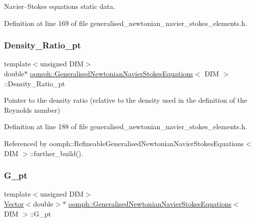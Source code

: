 Navier--Stokes equations static data. 

Definition at line 169 of file generalised\+\_\+newtonian\+\_\+navier\+\_\+stokes\+\_\+elements.\+h.

\mbox{\label{classoomph_1_1GeneralisedNewtonianNavierStokesEquations_a360d614813fbf4b87ad035226072b297}} 
\subsubsection{\texorpdfstring{Density\+\_\+\+Ratio\+\_\+pt}{Density\_Ratio\_pt}}
{\footnotesize\ttfamily template$<$unsigned D\+IM$>$ \\
double$\ast$ \hyperlink{classoomph_1_1GeneralisedNewtonianNavierStokesEquations}{oomph\+::\+Generalised\+Newtonian\+Navier\+Stokes\+Equations}$<$ D\+IM $>$\+::Density\+\_\+\+Ratio\+\_\+pt\hspace{0.3cm}{\ttfamily [protected]}}



Pointer to the density ratio (relative to the density used in the definition of the Reynolds number) 



Definition at line 188 of file generalised\+\_\+newtonian\+\_\+navier\+\_\+stokes\+\_\+elements.\+h.



Referenced by oomph\+::\+Refineable\+Generalised\+Newtonian\+Navier\+Stokes\+Equations$<$ D\+I\+M $>$\+::further\+\_\+build().

\mbox{\label{classoomph_1_1GeneralisedNewtonianNavierStokesEquations_aeca88320321b50470d839d15644140d9}} 
\subsubsection{\texorpdfstring{G\+\_\+pt}{G\_pt}}
{\footnotesize\ttfamily template$<$unsigned D\+IM$>$ \\
\hyperlink{classoomph_1_1Vector}{Vector}$<$double$>$$\ast$ \hyperlink{classoomph_1_1GeneralisedNewtonianNavierStokesEquations}{oomph\+::\+Generalised\+Newtonian\+Navier\+Stokes\+Equations}$<$ D\+IM $>$\+::G\+\_\+pt\hspace{0.3cm}{\ttfamily [protected]}}



